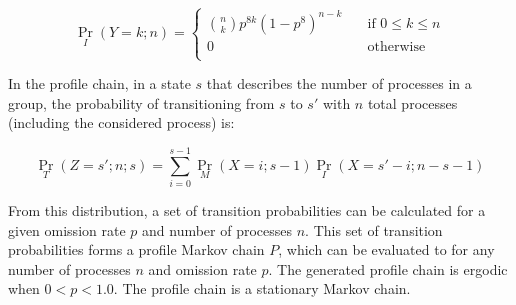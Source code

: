 \[
	\Pr_{I}(Y=k; n) =
	\begin{cases}
		\binom{n}{k} p^{8k}(1-p^8)^{n-k} & \quad \text{if } 0 \leq k \leq n \\
		0                                & \quad \text{otherwise} \\
	\end{cases}
\]

In the profile chain, in a state $s$ that describes the number of processes in a group, the probability of transitioning from $s$ to $s'$ with $n$ total processes (including the considered process) is:

\[ \Pr_{T}(Z=s'; n; s) = \sum_{i=0}^{s-1} \Pr_{M}(X=i; s-1) \Pr_{I}(X=s'-i; n-s-1) \]

From this distribution, a set of transition probabilities can be calculated for a given omission rate $p$ and number of processes $n$.
This set of transition probabilities forms a profile Markov chain $P$, which can be evaluated to for any number of processes $n$ and omission rate $p$.
The generated profile chain is ergodic when $0<p<1.0$. The profile chain is a stationary Markov chain.
